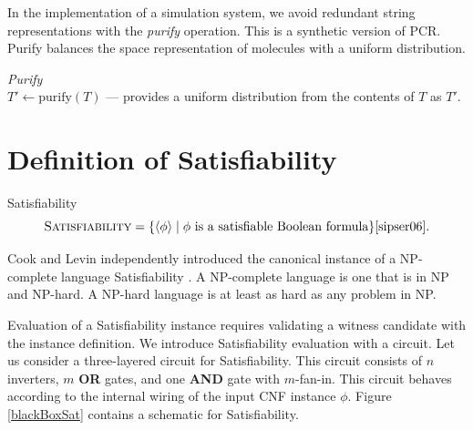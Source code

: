 In the implementation of a simulation system, we avoid redundant string representations with the \textit{purify} operation.  This is a synthetic version of PCR.  Purify balances the space representation of molecules with a uniform distribution.
\begin{definition}
\textit{Purify}\\
$T' \leftarrow \text{purify}(T)$ --- provides a uniform distribution from the contents of $T$ as $T'$.
\end{definition}


	
\section{Definition of {\sc Satisfiability}}

	

\begin{definition}
{\sc Satisfiability}\\
\[
\text{\sc Satisfiability} = \{ \langle \phi \rangle \mid \phi \text{ is a satisfiable Boolean formula}\} \cite{sipser06}.
\]	
\end{definition}

Cook and Levin independently introduced the canonical instance of a \textsf{NP-complete} language {\sc Satisfiability} \cite{Cook:1971:CTP:800157.805047, levin1973}.  A \textsf{NP-complete} language is one that is in \textsf{NP} and \textsf{NP-hard}.  A \textsf{NP-hard} language is at least as hard as any problem in \textsf{NP}.


Evaluation of a {\sc Satisfiability} instance requires validating a witness candidate with the instance definition.  We introduce {\sc Satisfiability} evaluation with a circuit.  Let us consider a three-layered circuit for {\sc Satisfiability}.  This circuit consists of $n$ inverters, $m$ \textbf{OR} gates, and one \textbf{AND} gate with $m$-fan-in.  This circuit behaves according to the internal wiring of the input CNF instance $\phi$. Figure \ref{blackBoxSat} contains a schematic for {\sc Satisfiability}.	

